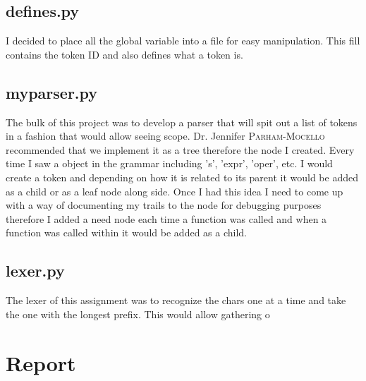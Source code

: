 \documentclass[letterpaper,10pt]{article}
\def\supervisor{Dr. Jennifer \textsc{Parham-Mocello }} %
\begin{document}
\subsection{defines.py}
\begin{mdframed}[style=MyFrame]
I decided to place all the global variable into a file for easy manipulation. This fill contains the token ID and also defines what a token is. 
\end{mdframed}
\subsection{myparser.py}
\begin{mdframed}[style=MyFrame]
The bulk of this project was to develop a parser that will spit out a list of tokens in a fashion that would allow seeing scope. \supervisor recommended that we implement it as a tree therefore the node I created. Every time I saw a object in the grammar including 's', 'expr', 'oper', etc. I would create a token and depending on how it is related to its parent it would be added as a child or as a leaf node along side. Once I had this idea I need to come up with a way of documenting my trails to the node for debugging purposes therefore I added a need node each time a function was called and when a function was called within it would be added as a child. 
\end{mdframed}
\subsection{lexer.py}
\begin{mdframed}[style=MyFrame]
The lexer of this assignment was to recognize the chars one at a time and take the one with the longest prefix. This would allow gathering o 
\end{mdframed}

\newpage
\section{Report}
\end{document}
